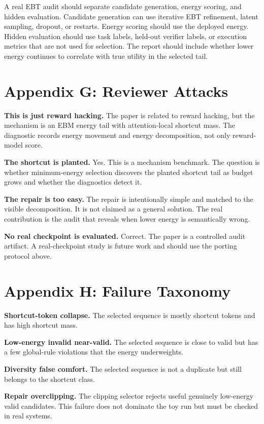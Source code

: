 \documentclass{article}
\begin{document}
A real EBT audit should separate candidate generation, energy scoring, and
hidden evaluation. Candidate generation can use iterative EBT refinement,
latent sampling, dropout, or restarts. Energy scoring should use the deployed
energy. Hidden evaluation should use task labels, held-out verifier labels, or
execution metrics that are not used for selection. The report should include
whether lower energy continues to correlate with true utility in the selected
tail.

\section{Appendix G: Reviewer Attacks}

\textbf{This is just reward hacking.}
The paper is related to reward hacking, but the mechanism is an EBM energy
tail with attention-local shortcut mass. The diagnostic records energy movement
and energy decomposition, not only reward-model score.

\textbf{The shortcut is planted.}
Yes. This is a mechanism benchmark. The question is whether minimum-energy
selection discovers the planted shortcut tail as budget grows and whether the
diagnostics detect it.

\textbf{The repair is too easy.}
The repair is intentionally simple and matched to the visible decomposition.
It is not claimed as a general solution. The real contribution is the audit
that reveals when lower energy is semantically wrong.

\textbf{No real checkpoint is evaluated.}
Correct. The paper is a controlled audit artifact. A real-checkpoint study is
future work and should use the porting protocol above.

\section{Appendix H: Failure Taxonomy}

\textbf{Shortcut-token collapse.}
The selected sequence is mostly shortcut tokens and has high shortcut mass.

\textbf{Low-energy invalid near-valid.}
The selected sequence is close to valid but has a few global-rule violations
that the energy underweights.

\textbf{Diversity false comfort.}
The selected sequence is not a duplicate but still belongs to the shortcut
class.

\textbf{Repair overclipping.}
The clipping selector rejects useful genuinely low-energy valid candidates.
This failure does not dominate the toy run but must be checked in real systems.
\end{document}
